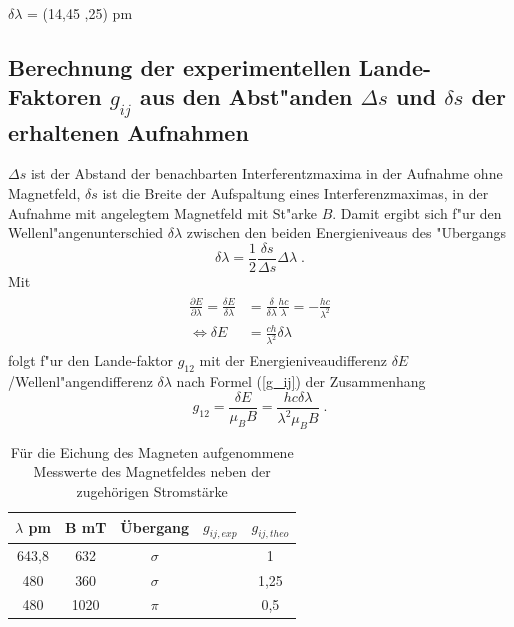 \begin{center}
$\delta \lambda$ = (14,45 ,25) pm
\end{center}


  \subsection{\texorpdfstring{Berechnung der experimentellen Lande-Faktoren $g_{ij}$ aus den Abst"anden $\Delta s$ und $\delta s$ der erhaltenen Aufnahmen}{Berechnung der experimentellen Lande-Faktoren g_{ij} aus den Abst"anden Delta s und delta s der erhaltenen Aufnahmen}}

  $\Delta s$ ist der Abstand der benachbarten Interferentzmaxima in der Aufnahme ohne Magnetfeld, $\delta s$ ist die Breite der Aufspaltung eines Interferenzmaximas, in der Aufnahme mit angelegtem Magnetfeld mit St"arke $B$.
  Damit ergibt sich f"ur den Wellenl"angenunterschied $\delta \lambda$ zwischen den beiden Energieniveaus des "Ubergangs
  \begin{equation}
    \delta \lambda = \frac{1}{2}\frac{\delta s}{\Delta s} \Delta \lambda \; .
  \end{equation}
  Mit
  \begin{align}
    \begin{split}
    \frac{\partial E}{\partial \lambda} = \frac{\delta E}{\delta \lambda} &= \frac{\delta}{\delta \lambda} \frac{hc}{\lambda} = -\frac{hc}{\lambda^2}\\
    \iff \delta E &= \frac{ch}{\lambda^2} \delta \lambda
   \end{split}
  \end{align}
  folgt f"ur den Lande-faktor $g_{12}$ mit der Energieniveaudifferenz $\delta E$/Wellenl"angendifferenz $\delta \lambda$ nach Formel (\ref{g_ij}) der Zusammenhang
  \begin{equation}
    g_{12}=\frac{\delta E}{\mu_BB}=\frac{hc\delta \lambda}{\lambda^2\mu_BB} \; .
  \end{equation}

          \begin{table}[H] 
	\centering
	\caption{Für die Eichung des Magneten aufgenommene Messwerte des Magnetfeldes neben der zugehörigen Stromstärke} 
	\begin{tabular}{c|c|c|c|c}

  $\lambda$ pm & B mT & Übergang & $g_{ij,exp}$& $g_{ij,theo}$\\
  \hline 
643,8 & 632 &$\sigma$&&1\\
480 &360&$\sigma$&&1,25\\
480 &1020 &$\pi$&&0,5\\


		
	\end{tabular} 
	  \label{tab:mit6}
\end{table} 



















